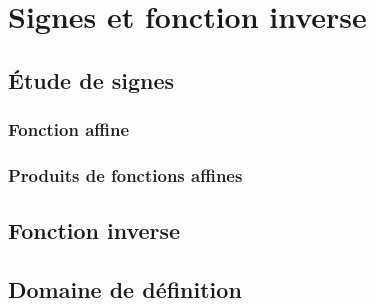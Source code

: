 
\chapter{Signes et fonction inverse}
\label{chap:signes}

\section{Étude de signes}

\subsection{Fonction affine}

\subsection{Produits de fonctions affines}

\section{Fonction inverse}



\section{Domaine de définition}



